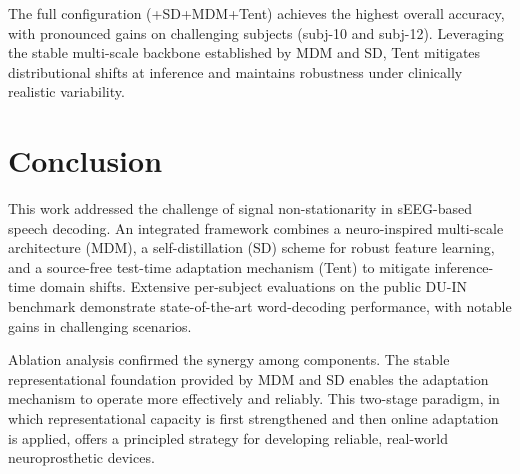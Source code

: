 \documentclass{article}
\begin{document}
The full configuration (+SD+MDM+Tent) achieves the highest overall accuracy, with pronounced gains on challenging subjects (subj-10 and subj-12). Leveraging the stable multi-scale backbone established by MDM and SD, Tent mitigates distributional shifts at inference and maintains robustness under clinically realistic variability.









\section{Conclusion}

This work addressed the challenge of signal non-stationarity in sEEG-based speech decoding. An integrated framework combines a neuro-inspired multi-scale architecture (MDM), a self-distillation (SD) scheme for robust feature learning, and a source-free test-time adaptation mechanism (Tent) to mitigate inference-time domain shifts. Extensive per-subject evaluations on the public DU-IN benchmark demonstrate state-of-the-art word-decoding performance, with notable gains in challenging scenarios.

Ablation analysis confirmed the synergy among components. The stable representational foundation provided by MDM and SD enables the adaptation mechanism to operate more effectively and reliably. This two-stage paradigm, in which representational capacity is first strengthened and then online adaptation is applied, offers a principled strategy for developing reliable, real-world neuroprosthetic devices.
\end{document}
